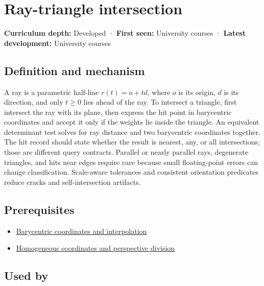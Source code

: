 \hypertarget{appendix-47ac1bd6d144}{}\label{referencestart:appendix-47ac1bd6d144}
\section{Ray-triangle intersection}\label{appendix-47ac1bd6d144-ray-triangle-intersection}

\textbf{Curriculum depth:} Developed · \textbf{First seen:} University courses · \textbf{Latest development:} University courses

\subsection{Definition and mechanism}\label{appendix-47ac1bd6d144-definition-and-mechanism}

A ray is a parametric half-line \(r(t)=o+td\), where \(o\) is its origin, \(d\) is its direction, and only \(t\ge0\) lies ahead of the ray. To intersect a triangle, first intersect the ray with its plane, then express the hit point in barycentric coordinates and accept it only if the weights lie inside the triangle. An equivalent determinant test solves for ray distance and two barycentric coordinates together. The hit record should state whether the result is nearest, any, or all intersections; those are different query contracts. Parallel or nearly parallel rays, degenerate triangles, and hits near edges require care because small floating-point errors can change classification. Scale-aware tolerances and consistent orientation predicates reduce cracks and self-intersection artifacts.

\subsection{Prerequisites}\label{appendix-47ac1bd6d144-prerequisites}

\begin{itemize}
\tightlist
\item
  \hyperref[appendix-02b9d9a81dca]{Barycentric coordinates and interpolation}
\item
  \hyperref[appendix-cb3b26862282]{Homogeneous coordinates and perspective division}
\end{itemize}

\subsection{Used by}\label{appendix-47ac1bd6d144-used-by}

